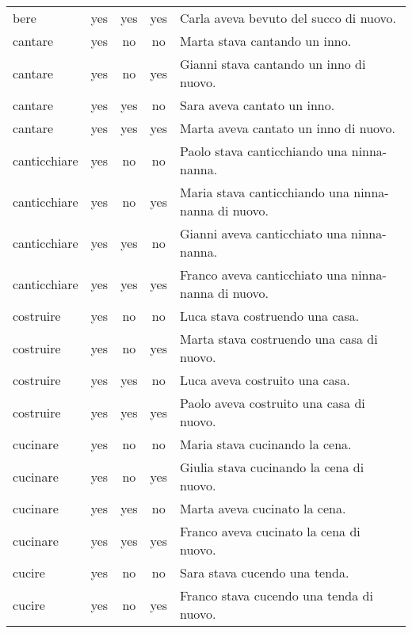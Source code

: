 \begin{longtable}{l|ccc|p{5cm}}
bere           & yes  & yes        & yes       & Carla aveva bevuto del succo di nuovo.              \\
cantare        & yes  & no         & no        & Marta stava cantando un inno.                       \\
cantare        & yes  & no         & yes       & Gianni stava cantando un inno di nuovo.             \\
cantare        & yes  & yes        & no        & Sara aveva cantato un inno.                         \\
cantare        & yes  & yes        & yes       & Marta aveva cantato un inno di nuovo.               \\
canticchiare   & yes  & no         & no        & Paolo stava canticchiando una ninna-nanna.          \\
canticchiare   & yes  & no         & yes       & Maria stava canticchiando una ninna-nanna di nuovo. \\
canticchiare   & yes  & yes        & no        & Gianni aveva canticchiato una ninna-nanna.          \\
canticchiare   & yes  & yes        & yes       & Franco aveva canticchiato una ninna-nanna di nuovo. \\
costruire      & yes  & no         & no        & Luca stava costruendo una casa.                     \\
costruire      & yes  & no         & yes       & Marta stava costruendo una casa di nuovo.           \\
costruire      & yes  & yes        & no        & Luca aveva costruito una casa.                      \\
costruire      & yes  & yes        & yes       & Paolo aveva costruito una casa di nuovo.            \\
cucinare       & yes  & no         & no        & Maria stava cucinando la cena.                      \\
cucinare       & yes  & no         & yes       & Giulia stava cucinando la cena di nuovo.            \\
cucinare       & yes  & yes        & no        & Marta aveva cucinato la cena.                       \\
cucinare       & yes  & yes        & yes       & Franco aveva cucinato la cena di nuovo.             \\
cucire         & yes  & no         & no        & Sara stava cucendo una tenda.                       \\
cucire         & yes  & no         & yes       & Franco stava cucendo una tenda di nuovo.            \\

\end{longtable}
